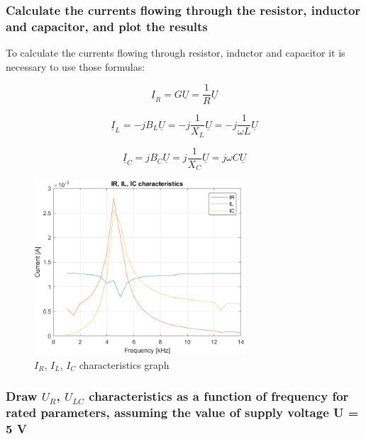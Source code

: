 \documentclass[]{scrartcl}
\begin{document}
\subsubsection{Calculate the currents flowing through the resistor, inductor and capacitor, and plot the results}

To calculate the currents flowing through resistor, inductor and capacitor it is necessary to use those formulas:

\begin{equation}
    \underline{I}_R=G\underline{U}=\frac{1}{R}\underline{U}
\end{equation}

\begin{equation}
    \underline{I}_L=-jB_L\underline{U}=-j\frac{1}{X_L}\underline{U}=-j\frac{1}{\omega L}\underline{U}
\end{equation}

\begin{equation}
    \underline{I}_C=jB_C\underline{U}=j\frac{1}{X_C}\underline{U}=j\omega C\underline{U}
\end{equation}



\begin{figure}[H]
	\centering
	\includegraphics[width=0.7\textwidth]{Pictures/ct_char_05.png}
	\caption{$I_R$, $I_L$, $I_C$ characteristics graph}
	\label{fig:IR, IL, IC char}
\end{figure}

\subsubsection{Draw $U_R$, $U_{LC}$ characteristics as a function of frequency for rated parameters, assuming the value of supply voltage U = 5 V}
\end{document}
